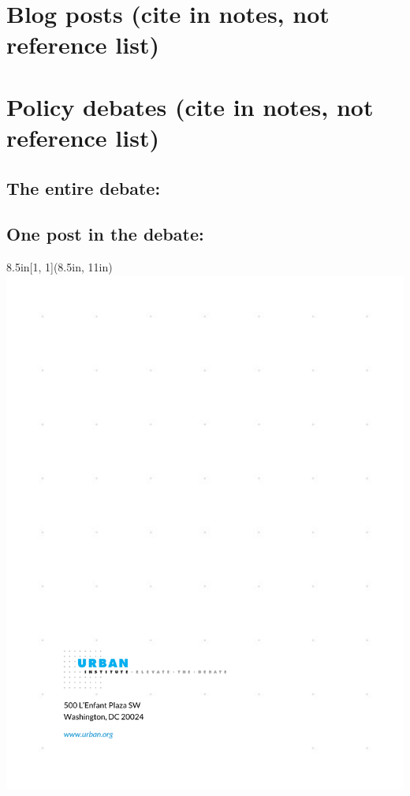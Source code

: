 \documentclass{urban-formatting}
\begin{document}
\section{Blog posts (cite in notes, not reference list)}

\section{Policy debates (cite in notes, not reference list)}

\subsection{The entire debate:}

\subsection{One post in the debate:}

\cite{Ful83}











\newpage
\thispagestyle{empty}

\begin{textblock*}{8.5in}[1, 1](8.5in, 11in)
    \noindent\includegraphics[width=\paperwidth,height=\paperheight]{images/back.pdf}
\end{textblock*}
\end{document}
